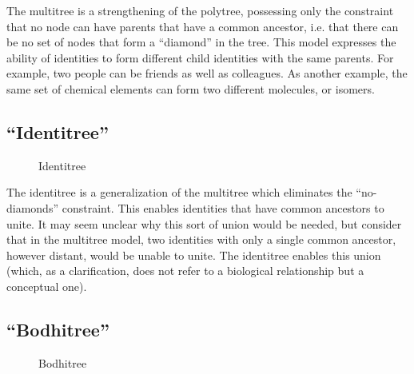 \documentclass[pra,twocolumn,groupedaddress,10pt]{revtex4}
\theoremstyle{definition}
\begin{document}
The multitree\cite{multitree} is a strengthening of the polytree, possessing only the constraint that no node can have parents that have a common ancestor, i.e. that there can be no set of nodes that form a ``diamond'' in the tree. This model expresses the ability of identities to form different child identities with the same parents. For example, two people can be friends as well as colleagues. As another example, the same set of chemical elements can form two different molecules, or isomers.

\subsection{``Identitree''} \label{sec:identitree}

\begin{figure}[htp]
\centering
{}
\caption{\label{fig:identitree}Identitree}
\end{figure}

The identitree is a generalization of the multitree which eliminates the ``no-diamonds'' constraint. This enables identities that have common ancestors to unite. It may seem unclear why this sort of union would be needed, but consider that in the multitree model, two identities with only a single common ancestor, however distant, would be unable to unite. The identitree enables this union (which, as a clarification, does not refer to a biological relationship but a conceptual one).

\subsection{``Bodhitree''} \label{sec:bodhitree}

\begin{figure}[htp]
\centering
{}
\caption{\label{fig:bodhitree}Bodhitree}
\end{figure}
\end{document}
